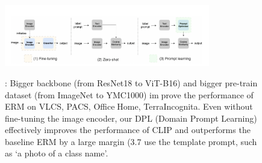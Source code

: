 \documentclass{article}
\begin{document}
\begin{multicols}{2}
\begin{enumerate}
\end{enumerate}
 

\end{multicols}
\begin{figure}[H]
         \centering
         \includegraphics[width=0.8\textwidth]{2.png}
         \label{fig:three sin x}
         \caption{: Bigger backbone (from ResNet18 to ViT-B16) and
bigger pre-train dataset (from ImageNet to YMC1000) improve the performance of ERM on VLCS, PACS, OfficeHome, TerraIncognita. Even without fine-tuning the image
encoder, our DPL (Domain Prompt Learning) effectively
improves the performance of CLIP and outperforms the
baseline ERM by a large margin (3.7%
use the template prompt, such as ‘a photo of a {class name}’.
}
\end{figure}
\end{document}
